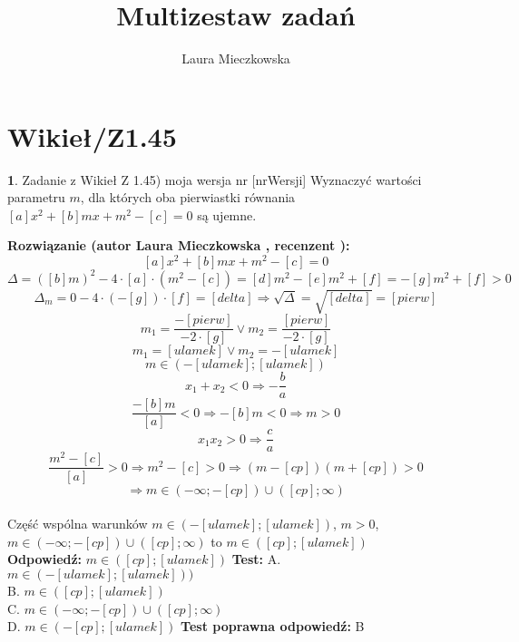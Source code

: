 \documentclass[12pt, a4paper]{article}
\title{Multizestaw zadań}
\author{Laura Mieczkowska}
\date{}
\theoremstyle{definition} %
\newtheorem{zad}{}
\newcommand{\kategoria}[1]{\section{#1}} %
\newcommand{\zadStart}[1]{\begin{zad}#1\newline} %
\newcommand{\zadStop}{\end{zad}}   %
\newcommand{\rozwStart}[2]{\noindent \textbf{Rozwiązanie (autor #1 , recenzent #2): }\newline} %
\newcommand{\odpStart}{\noindent \textbf{Odpowiedź:}\newline}    %
\newcommand{\odpStop}{\newline}                                             %
\newcommand{\testStart}{\noindent \textbf{Test:}\newline} %
\newcommand{\testStop}{\newline} %
\newcommand{\kluczStart}{\noindent \textbf{Test poprawna odpowiedź:}\newline} %
\newcommand{\kluczStop}{\newline} %
\begin{document}
\maketitle


\kategoria{Wikieł/Z1.45}
\zadStart{Zadanie z Wikieł Z 1.45) moja wersja nr [nrWersji]}
Wyznaczyć wartości parametru $m$, dla których oba pierwiastki równania $[a]x^2+[b]mx+m^2-[c]=0$ są ujemne.
\zadStop
\rozwStart{Laura Mieczkowska}{}
$$[a]x^2+[b]mx+m^2-[c]=0$$
$$\Delta=([b]m)^2-4\cdot[a]\cdot(m^2-[c])=[d]m^2-[e]m^2+[f]=-[g]m^2+[f]>0$$
$$\Delta_m=0-4\cdot(-[g])\cdot[f]=[delta] \Rightarrow \sqrt{\Delta}=\sqrt{[delta]}=[pierw]$$
$$m_1=\frac{-[pierw]}{-2\cdot[g]} \vee m_2=\frac{[pierw]}{-2\cdot[g]}$$
$$m_1=[ulamek] \vee m_2=-[ulamek]$$
$$m\in (-[ulamek];[ulamek])$$
$$x_1+x_2<0 \Rightarrow -\frac{b}{a}$$
$$\frac{-[b]m}{[a]}<0 \Rightarrow -[b]m<0 \Rightarrow m>0$$
$$x_1x_2>0 \Rightarrow \frac{c}{a}$$
$$\frac{m^2-[c]}{[a]}>0 \Rightarrow m^2-[c]>0 \Rightarrow (m-[cp])(m+[cp])>0$$
$$\Rightarrow m\in(-\infty;-[cp])\cup([cp];\infty)$$
\\Część wspólna warunków $m\in (-[ulamek];[ulamek])$, $m>0$, $m\in(-\infty;-[cp])\cup([cp];\infty)$
to $m\in([cp];[ulamek])$ 
$$$$
\odpStart
$m\in([cp];[ulamek])$
\odpStop
\testStart
A. $m\in(-[ulamek];[ulamek]))$ \\
B. $m\in([cp];[ulamek])$ \\
C. $m\in(-\infty;-[cp])\cup([cp];\infty)$ \\
D. $m\in(-[cp];[ulamek])$ 
\testStop
\kluczStart
B
\kluczStop
\end{document}
